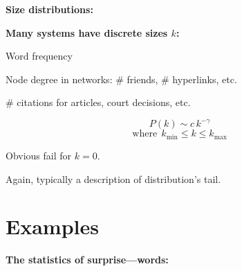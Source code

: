     

  


  \textbf{Size distributions:}

  \textbf{Many systems have discrete sizes $k$:}
    
    
      Word frequency
    
      Node degree in networks: \# friends, \# hyperlinks, etc.
    
      \# citations for articles, court decisions, etc.
    
  

  
    $$P(k) \sim  c\, k^{-\gamma}$$
    $$\mbox{where} \ \  k_{\textrm{min}} \le k \le k_{\textrm{max}}$$
    
     
      Obvious fail for $k=0$.
     
      Again, typically a description of distribution's tail.
    
  



\section{Examples}

\textbf{The statistics of surprise---words:}


